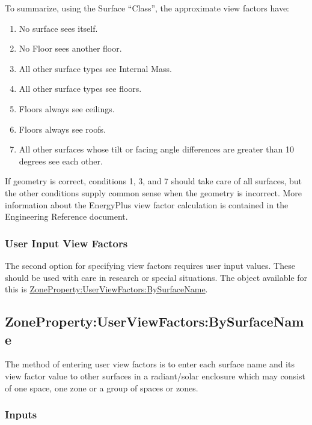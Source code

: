 To summarize, using the Surface ``Class'', the approximate view factors have:

\begin{enumerate}
  \item
    No surface sees itself.
  \item
    No Floor sees another floor.
  \item
    All other surface types see Internal Mass.
  \item
    All other surface types see floors.
  \item
    Floors always see ceilings.
  \item
    Floors always see roofs.
  \item
    All other surfaces whose tilt or facing angle differences are greater than 10 degrees see each other.
\end{enumerate}

If geometry is correct, conditions 1, 3, and 7 should take care of all surfaces, but the other conditions supply common sense when the geometry is incorrect. More information about the EnergyPlus view factor calculation is contained in the Engineering Reference document.

\subsubsection{User Input View Factors}\label{user-input-view-factors}

The second option for specifying view factors requires user input values. These should be used with care in research or special situations. The object available for this is \hyperref[zonepropertyuserviewfactorsbysurfacename]{ZoneProperty:UserViewFactors:BySurfaceName}.

\subsection{ZoneProperty:UserViewFactors:BySurfaceName}\label{zonepropertyuserviewfactorsbysurfacename}

The method of entering user view factors is to enter each surface name and its view factor value to other
surfaces in a radiant/solar enclosure which may consist of one space, one zone or a group of spaces or zones.

\subsubsection{Inputs}\label{inputs-17}

